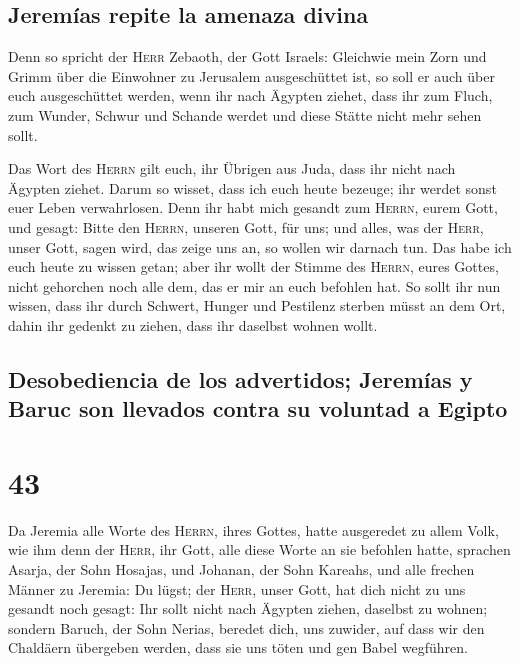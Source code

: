 \hypertarget{jeremuxedas-repite-la-amenaza-divina}{%
\subsection{Jeremías repite la amenaza
divina}\label{jeremuxedas-repite-la-amenaza-divina}}

 Denn so spricht der \textsc{Herr} Zebaoth, der Gott
Israels: Gleichwie mein Zorn und Grimm über die Einwohner zu Jerusalem
ausgeschüttet ist, so soll er auch über euch ausgeschüttet werden, wenn
ihr nach Ägypten ziehet, dass ihr zum Fluch, zum Wunder, Schwur und
Schande werdet und diese Stätte nicht mehr sehen sollt.

 Das Wort des \textsc{Herrn} gilt euch, ihr Übrigen aus
Juda, dass ihr nicht nach Ägypten ziehet. Darum so wisset, dass ich euch
heute bezeuge;  ihr werdet sonst euer Leben verwahrlosen.
Denn ihr habt mich gesandt zum \textsc{Herrn}, eurem Gott, und gesagt:
Bitte den \textsc{Herrn}, unseren Gott, für uns; und alles, was der
\textsc{Herr}, unser Gott, sagen wird, das zeige uns an, so wollen wir
darnach tun.  Das habe ich euch heute zu wissen getan;
aber ihr wollt der Stimme des \textsc{Herrn}, eures Gottes, nicht
gehorchen noch alle dem, das er mir an euch befohlen hat.
 So sollt ihr nun wissen, dass ihr durch Schwert, Hunger
und Pestilenz sterben müsst an dem Ort, dahin ihr gedenkt zu ziehen,
dass ihr daselbst wohnen wollt.

\hypertarget{desobediencia-de-los-advertidos-jeremuxedas-y-baruc-son-llevados-contra-su-voluntad-a-egipto}{%
\subsection{Desobediencia de los advertidos; Jeremías y Baruc son
llevados contra su voluntad a
Egipto}\label{desobediencia-de-los-advertidos-jeremuxedas-y-baruc-son-llevados-contra-su-voluntad-a-egipto}}

\hypertarget{section-42}{%
\section{43}\label{section-42}}

 Da Jeremia alle Worte des \textsc{Herrn}, ihres Gottes,
hatte ausgeredet zu allem Volk, wie ihm denn der \textsc{Herr}, ihr
Gott, alle diese Worte an sie befohlen hatte,  sprachen
Asarja, der Sohn Hosajas, und Johanan, der Sohn Kareahs, und alle
frechen Männer zu Jeremia: Du lügst; der \textsc{Herr}, unser Gott, hat
dich nicht zu uns gesandt noch gesagt: Ihr sollt nicht nach Ägypten
ziehen, daselbst zu wohnen;  sondern Baruch, der Sohn
Nerias, beredet dich, uns zuwider, auf dass wir den Chaldäern übergeben
werden, dass sie uns töten und gen Babel wegführen.

